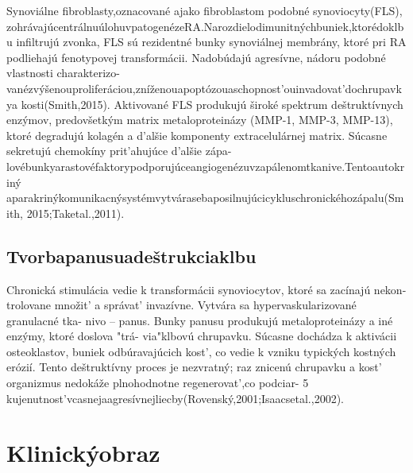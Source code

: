 Synoviálne fibroblasty,oznacované ajako fibroblastom podobné synoviocyty(FLS), zohrávajúcentrálnuúlohuvpatogenézeRA.Narozdielodimunitnýchbuniek,ktorédoklbu infiltrujú zvonka, FLS sú rezidentné bunky synoviálnej membrány, ktoré pri RA podliehajú fenotypovej transformácii. Nadobúdajú agresívne, nádoru podobné vlastnosti charakterizo- vanézvýšenouproliferáciou,zníženouapoptózouaschopnost’ouinvadovat’dochrupavkya kosti(Smith,2015). Aktivované FLS produkujú široké spektrum deštruktívnych enzýmov, predovšetkým matrix metaloproteinázy (MMP-1, MMP-3, MMP-13), ktoré degradujú kolagén a d’alšie komponenty extracelulárnej matrix. Súcasne sekretujú chemokíny prit’ahujúce d’alšie zápa- lovébunkyarastovéfaktorypodporujúceangiogenézuvzapálenomtkanive.Tentoautokriný aparakrinýkomunikacnýsystémvytvárasebaposilnujúcicykluschronickéhozápalu(Smith, 2015;Taketal.,2011).


\subsection{Tvorbapanusuadeštrukciaklbu}

Chronická stimulácia vedie k transformácii synoviocytov, ktoré sa zacínajú nekon- trolovane množit’ a správat’ invazívne. Vytvára sa hypervaskularizované granulacné tka- nivo -- panus. Bunky panusu produkujú metaloproteinázy a iné enzýmy, ktoré doslova "trá- via"klbovú chrupavku. Súcasne dochádza k aktivácii osteoklastov, buniek odbúravajúcich kost’, co vedie k vzniku typických kostných erózií. Tento deštruktívny proces je nezvratný; raz znicenú chrupavku a kost’ organizmus nedokáže plnohodnotne regenerovat’,co podciar- 5 kujenutnost’vcasnejaagresívnejliecby(Rovenský,2001;Isaacsetal.,2002).


\section{Klinickýobraz}

